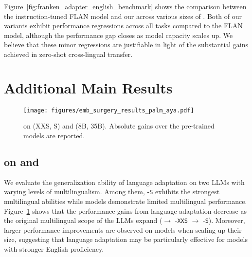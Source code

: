 Figure~\ref{fig:franken_adapter_english_benchmark} shows the comparison between the instruction-tuned FLAN model and our \ouradapter across various sizes of \gemmatwo. Both of our \ouradapter variants exhibit performance regressions across all tasks compared to the FLAN model, although the performance gap closes as model capacity scales up. We believe that these minor regressions are justifiable in light of the substantial gains achieved in zero-shot cross-lingual transfer.



\section{Additional Main Results}\label{appendix:extra_main_results}

\begin{figure}
    \setlength{\abovecaptionskip}{-0.0001cm}
    \setlength{\belowcaptionskip}{-0.35cm}
    \centering
    \texttt{[image: figures/emb\_surgery\_results\_palm\_aya.pdf]}
    \vspace{-8mm}
    \caption{\la on \palmtwo (XXS, S) and \aya (8B, 35B). Absolute gains over the pre-trained models are reported.}
    \vspace{-6mm}
    \label{fig:palm_aya_results}
\end{figure}
\subsection{\la on \palmtwo and \aya}\label{appendix:extra_la_results}
We evaluate the generalization ability of language adaptation on two LLMs with varying levels of multilingualism. Among them, \palmtwo-\texttt{S} exhibits the strongest multilingual abilities while \aya models demonstrate limited multilingual performance. Figure~\ref{fig:palm_aya_results} shows that the performance gains from language adaptation decrease as the original multilingual scope of the LLMs expand (\aya $\rightarrow$ \palmtwo-\texttt{XXS} $\rightarrow$ \palmtwo-\texttt{S}). Moreover, larger performance improvements are observed on \aya models when scaling up their size, suggesting that language adaptation may be particularly effective for models with stronger English proficiency.


